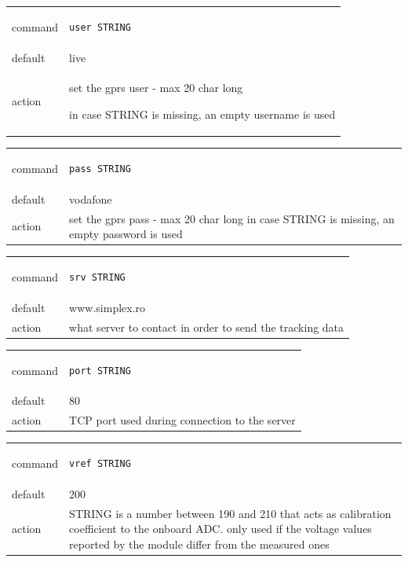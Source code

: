 \documentclass[a4paper,twoside]{refart}
\begin{document}
\begin{tabular}{ |l|p{8cm}| }
    \hline
        command & 
\begin{lstlisting}
user STRING
\end{lstlisting} \\
        default & live \\
        action & 
set the gprs user  - max 20 char long

in case STRING is missing, an empty username is used  \\ \hline
\end{tabular}


\begin{tabular}{ |l|p{8cm}| }
    \hline
        command & 
\begin{lstlisting}
pass STRING
\end{lstlisting} \\
        default & vodafone \\
        action & 
set the gprs pass - max 20 char long
in case STRING is missing, an empty password is used  \\ \hline
\end{tabular}


\begin{tabular}{ |l|p{8cm}| }
    \hline
        command & 
\begin{lstlisting}
srv STRING
\end{lstlisting} \\
        default & www.simplex.ro \\
        action & 
what server to contact in order to send the tracking data \\ \hline
\end{tabular}


\begin{tabular}{ |l|p{8cm}| }
    \hline
        command & 
\begin{lstlisting}
port STRING
\end{lstlisting} \\
        default & 80 \\
        action & 
TCP port used during connection to the server  \\ \hline
\end{tabular}


\begin{tabular}{ |l|p{8cm}| }
    \hline
        command & 
\begin{lstlisting}
vref STRING
\end{lstlisting} \\
        default & 200 \\
        action & 
STRING is a number between 190 and 210 that acts as calibration coefficient to the onboard ADC. only used if the voltage values reported by the module differ from the measured ones \\ \hline
\end{tabular}
\end{document}

